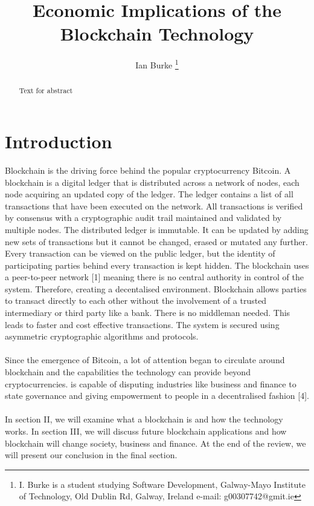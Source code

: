 \documentclass[report]{IEEEtran}
\begin{document}
\title{Economic Implications of the Blockchain Technology}
\author{Ian Burke %
\thanks{I. Burke is a student studying
Software Development, Galway-Mayo Institute of Technology, Old Dublin Rd, Galway, Ireland e-mail: g00307742@gmit.ie}%
}

\maketitle

\begin{abstract}
Text for abstract
\end{abstract}


\section{Introduction}
Blockchain is the driving force behind the popular cryptocurrency Bitcoin. A blockchain is a digital ledger that is distributed across a network of nodes, each node acquiring an updated copy of the ledger. The ledger contains a list of all transactions that have been executed on the network. All transactions is verified by consensus with a cryptographic audit trail maintained and validated by multiple nodes. The distributed ledger is immutable. It can be updated by adding new sets of transactions but it cannot be changed, erased or mutated any further. Every transaction can be viewed on the public ledger, but the identity of participating parties behind every transaction is kept hidden. The blockchain uses a peer-to-peer network [1] meaning there is no central authority in control of the system. Therefore, creating a decentalised environment. Blockchain allows parties to transact directly to each other without the involvement of a trusted intermediary or third party like a bank. There is no middleman needed. This leads to faster and cost effective transactions. The system is secured using asymmetric cryptographic algorithms and protocols.
\\\\ Since the emergence of Bitcoin, a lot of attention began to circulate around blockchain and the capabilities the technology can provide beyond cryptocurrencies. is capable of disputing industries like business and finance to state governance and giving empowerment to people in a decentralised fashion [4].
\\\\ In section II, we will examine what a blockchain is and how the technology works. In section III, we will discuss future blockchain applications and how blockchain will change society, business and finance. At the end of the review, we will present our conclusion in the final section.
\end{document}
